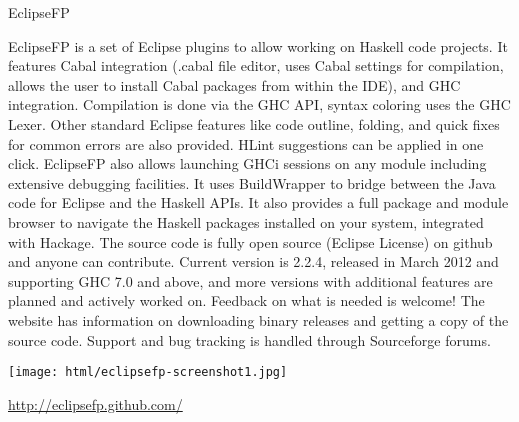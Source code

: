 \begin{hcarentry}{EclipseFP}
\makeheader

EclipseFP is a set of Eclipse plugins to allow working on Haskell code projects.
It features Cabal integration (.cabal file editor, uses Cabal settings for compilation, allows the user to install Cabal packages from within the IDE), and GHC integration. Compilation is done via the GHC API, syntax coloring uses the GHC Lexer. Other standard Eclipse features like code outline, folding, and quick fixes for common errors are also provided. HLint suggestions can be applied in one click. EclipseFP also allows launching GHCi sessions on any module including extensive debugging facilities. It uses BuildWrapper to bridge between the Java code for Eclipse and the Haskell APIs. It also provides a full package and module browser to navigate the Haskell packages installed on your system, integrated with Hackage.
The source code is fully open source (Eclipse License) on github and anyone can contribute. Current version is 2.2.4, released in March 2012 and supporting GHC 7.0 and above, and more versions with additional features are planned and actively worked on. Feedback on what is needed is welcome! The website has information on downloading binary releases and getting a copy of the source code. Support and bug tracking is handled through Sourceforge forums.

\begin{center}
\texttt{[image: html/eclipsefp-screenshot1.jpg]}
\end{center}

\FurtherReading 
\url{http://eclipsefp.github.com/}
\end{hcarentry}
